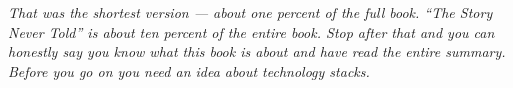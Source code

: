 \vspace{1cm}
\begin{center}
\textit{That was the shortest version --- about one percent of the full book. ``The Story Never Told'' is about ten percent of the entire book. Stop after that and you can honestly say you know what this book is about and have read the entire summary. Before you go on you need an idea about technology stacks.}
\end{center}
